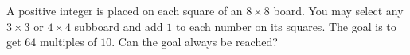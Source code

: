 A positive integer is placed on each square of an $8 \times 8$ board. You may select any $3 \times 3$ or $4 \times 4$ subboard and add $1$ to each number on its squares. The goal is to get $64$ multiples of $10$. Can the goal always be reached?
